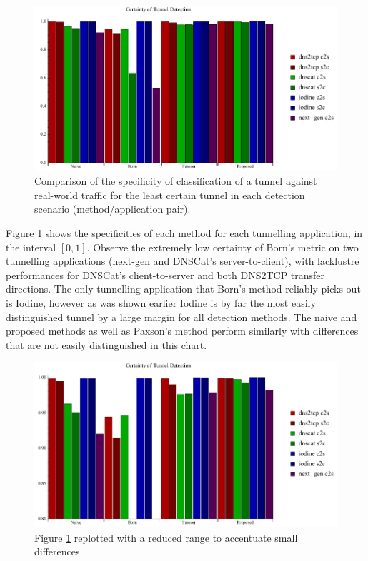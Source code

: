 \documentclass[12pt]{report}
\theoremstyle{remark}
\theoremstyle{definition}
\theoremstyle{definition}
\theoremstyle{definition}
\begin{document}
\begin{figure}
\centering
\includegraphics[width=\textwidth]{figures/cplot.pdf}
\caption[Chart of Specificity of Detection by Tunnel Application and Detection
Method]{Comparison of the specificity of classification of a tunnel against
real-world traffic for the least certain tunnel in each detection scenario
(method/application pair).}
\label{cplot}
\end{figure}

Figure \ref{cplot} shows the specificities of each method for each tunnelling
application, in the interval $[0,1]$. Observe the extremely
low certainty of Born's metric on two tunnelling applications (next-gen and
DNSCat's server-to-client), with lacklustre performances for DNSCat's
client-to-server and both DNS2TCP transfer directions. The only tunnelling
application that Born's method reliably picks out is Iodine, however as was
shown earlier Iodine is by far the most easily distinguished tunnel by a large
margin for all detection methods. The naive and proposed methods as well as
Paxson's method perform similarly with differences that are not easily
distinguished in this chart.

\begin{figure}
\centering
\includegraphics[width=\textwidth]{figures/cplot2.pdf}
\caption[Chart of Certainty of Detection by Tunnel Application and Detection
Method - 0.80 to 1.00]{Figure \ref{cplot} replotted with a reduced range to
accentuate small differences.}
\label{cplot80}
\end{figure}
\end{document}
